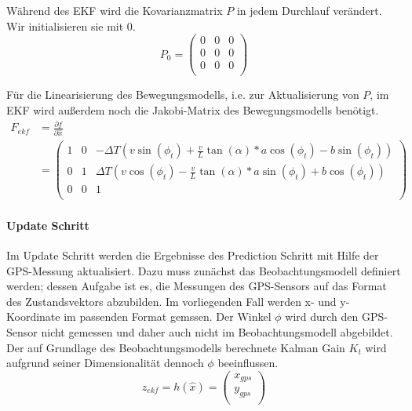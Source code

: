 \documentclass[11pt]{article}
\begin{document}
Während des EKF wird die Kovarianzmatrix $P$ in jedem Durchlauf verändert. Wir initialisieren sie mit $0$. 
\begin{equation}\label{EKF-Initiale-Kovarianzmatrix}
	P_{0} = \begin{pmatrix}
		0 & 0 & 0 \\
		0 & 0 & 0 \\
		0 & 0 & 0 \\
	  \end{pmatrix}
\end{equation}

Für die Linearisierung des Bewegungsmodells, i.e. zur Aktualisierung von $P$, im EKF wird außerdem noch die Jakobi-Matrix des Bewegungsmodells benötigt.
\begin{equation}\label{EKF-Motion-Model-Jakobi-Matrix}
\begin{split}
	F_{ekf} &= \frac{\partial f}{\partial \hat{x}} \\
	&= \begin{pmatrix}
		1 & 0 & -\Delta T(v\sin(\phi_t)+\frac{v}{L}\tan(\alpha)*a\cos(\phi_t)-b\sin(\phi_t)) \\
		0 & 1 & \Delta T(v\cos(\phi_t)-\frac{v}{L}\tan(\alpha)*a\sin(\phi_t)+b\cos(\phi_t)) \\
		0 & 0 & 1 \\
	  \end{pmatrix}
\end{split}
\end{equation}

\paragraph{Update Schritt}
Im Update Schritt werden die Ergebnisse des Prediction Schritt mit Hilfe der GPS-Messung aktualisiert. Dazu muss zunächst das Beobachtungsmodell definiert werden; dessen Aufgabe ist es, die Messungen des GPS-Sensors auf das Format des Zustandsvektors abzubilden. Im vorliegenden Fall werden x- und y-Koordinate im passenden Format gemssen. Der Winkel $\phi$ wird durch den GPS-Sensor nicht gemessen und daher auch nicht im Beobachtungsmodell abgebildet. Der auf Grundlage des Beobachtungsmodells berechnete Kalman Gain $K_t$ wird aufgrund seiner Dimensionalität dennoch $\phi$ beeinflussen.
\begin{equation}\label{EKF-Observation-Model}
	z_{ekf} = h(\hat{x}) = \begin{pmatrix}
		x_{gps} \\
		y_{gps} \\
	\end{pmatrix}
\end{equation}
\end{document}
